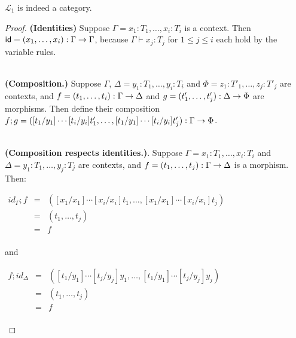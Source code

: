 \begin{lemma}
  \label{lemma:class-stlc}
  $\mathcal{L}_1$ is indeed a category.
\end{lemma}
\begin{proof}
  \textbf{(Identities)} Suppose $\Gamma = x_1:T_1,\ldots,x_i:T_i$ is a
  context.  Then $\mathsf{id} = (x_1,\ldots,x_i) : \Gamma \rightarrow
  \Gamma$, because $\Gamma \vdash x_j : T_j$ for $1 \leq j \leq i$
  each hold by the variable rules.

  \ \\ \textbf{(Composition.)}  Suppose $\Gamma$, $\Delta =
  y_1:T_1,\ldots,y_i:T_i$ and $\Phi = z_1:T'_1,\ldots,z_j:T'_j$ are
  contexts, and $f = (t_1,\ldots,t_i) : \Gamma \rightarrow \Delta$ and $g =
  (t'_1,\ldots,t'_j) : \Delta \rightarrow \Phi$ are morphisms.  Then define
  their composition $f;g =
  ([t_1/y_1]\cdots[t_i/y_i]t'_1,\ldots,[t_1/y_1]\cdots[t_i/y_i]t'_j):
  \Gamma \rightarrow \Phi$.

  \ \\ \textbf{(Composition respects identities.)}. Suppose $\Gamma =
  x_1:T_1,\ldots,x_i:T_i$ and $\Delta = y_1:T_1,\ldots,y_j:T_j$ are
  contexts, and $f = (t_1,\ldots,t_j) : \Gamma \rightarrow \Delta$ is a
  morphism.  Then:
  \begin{center}
    \begin{math}
      \begin{array}{lll}
        id_{\Gamma};f
        & = & ([x_1/x_1]\cdots[x_i/x_i]t_1,\ldots,[x_1/x_1]\cdots[x_i/x_i]t_j)\\
        & = & (t_1,\ldots,t_j)\\
        & = & f\\
      \end{array}
    \end{math}
  \end{center}
  and
  \begin{center}
    \begin{math}
      \begin{array}{lll}
        f;id_{\Delta}
        & = & ([t_1/y_1]\cdots[t_j/y_j]y_1,\ldots,[t_1/y_1]\cdots[t_j/y_j]y_j)\\
        & = & (t_1,\ldots,t_j)\\
        & = & f\\
      \end{array}
    \end{math}
  \end{center}
\end{proof}
